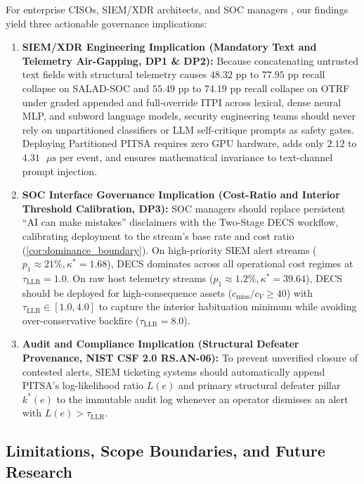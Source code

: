 \documentclass[11pt,a4paper]{article}
\begin{document}
For enterprise CISOs, SIEM/XDR architects, and SOC managers \citep{liu2020centralized, li2021roles, davison2025research}, our findings yield three actionable governance implications:
\begin{enumerate}
  \item \textbf{SIEM/XDR Engineering Implication (Mandatory Text and Telemetry Air-Gapping, DP1 \& DP2):} Because concatenating untrusted text fields with structural telemetry causes $48.32\text{ pp}$ to $77.95\text{ pp}$ recall collapse on SALAD-SOC and $55.49\text{ pp}$ to $74.19\text{ pp}$ recall collapse on OTRF under graded appended and full-override ITPI across lexical, dense neural MLP, and subword language models, security engineering teams should never rely on unpartitioned classifiers or LLM self-critique prompts as safety gates. Deploying Partitioned PITSA requires zero GPU hardware, adds only $2.12$ to $4.31\text{ }\mu\text{s}$ per event, and ensures mathematical invariance to text-channel prompt injection.
  \item \textbf{SOC Interface Governance Implication (Cost-Ratio and Interior Threshold Calibration, DP3):} SOC managers should replace persistent ``AI can make mistakes'' disclaimers with the Two-Stage DECS workflow, calibrating deployment to the stream's base rate and cost ratio (\cref{cor:dominance_boundary}). On high-priority SIEM alert streams ($p_1 \approx 21\%, \kappa^* = 1.68$), DECS dominates across all operational cost regimes at $\tau_{\text{LLR}} = 1.0$. On raw host telemetry streams ($p_1 \approx 1.2\%, \kappa^* = 39.64$), DECS should be deployed for high-consequence assets ($c_{\text{miss}}/c_V \ge 40$) with $\tau_{\text{LLR}} \in [1.0, 4.0]$ to capture the interior habituation minimum while avoiding over-conservative backfire ($\tau_{\text{LLR}} = 8.0$).
  \item \textbf{Audit and Compliance Implication (Structural Defeater Provenance, NIST CSF 2.0 RS.AN-06):} To prevent unverified closure of contested alerts, SIEM ticketing systems should automatically append PITSA's log-likelihood ratio $L(e)$ and primary structural defeater pillar $k^*(e)$ to the immutable audit log whenever an operator dismisses an alert with $L(e) > \tau_{\text{LLR}}$.
\end{enumerate}

\subsection{Limitations, Scope Boundaries, and Future Research}
\label{subsec:disc_limitations}
\end{document}
